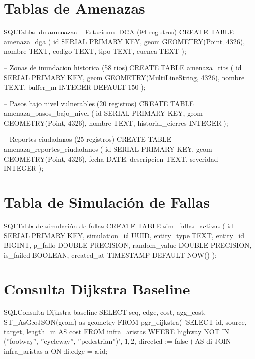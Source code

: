 \documentclass[conference]{IEEEtran}
\begin{document}
\section{Tablas de Amenazas}
\label{app:amenazas}

\begin{mycode}{SQL}{Tablas de amenazas}
-- Estaciones DGA (94 registros)
CREATE TABLE amenaza_dga (
    id SERIAL PRIMARY KEY,
    geom GEOMETRY(Point, 4326),
    nombre TEXT,
    codigo TEXT,
    tipo TEXT,
    cuenca TEXT
);

-- Zonas de inundacion historica (58 rios)
CREATE TABLE amenaza_rios (
    id SERIAL PRIMARY KEY,
    geom GEOMETRY(MultiLineString, 4326),
    nombre TEXT,
    buffer_m INTEGER DEFAULT 150
);

-- Pasos bajo nivel vulnerables (20 registros)
CREATE TABLE amenaza_pasos_bajo_nivel (
    id SERIAL PRIMARY KEY,
    geom GEOMETRY(Point, 4326),
    nombre TEXT,
    historial_cierres INTEGER
);

-- Reportes ciudadanos (25 registros)
CREATE TABLE amenaza_reportes_ciudadanos (
    id SERIAL PRIMARY KEY,
    geom GEOMETRY(Point, 4326),
    fecha DATE,
    descripcion TEXT,
    severidad INTEGER
);
\end{mycode}

\section{Tabla de Simulación de Fallas}
\label{app:simulacion}

\begin{mycode}{SQL}{Tabla de simulación de fallas}
CREATE TABLE sim_fallas_activas (
    id SERIAL PRIMARY KEY,
    simulation_id UUID,
    entity_type TEXT,
    entity_id BIGINT,
    p_fallo DOUBLE PRECISION,
    random_value DOUBLE PRECISION,
    is_failed BOOLEAN,
    created_at TIMESTAMP DEFAULT NOW()
);
\end{mycode}

\section{Consulta Dijkstra Baseline}
\label{app:dijkstra_baseline}

\begin{mycode}{SQL}{Consulta Dijkstra baseline}
SELECT seq, edge, cost, agg_cost,
       ST_AsGeoJSON(geom) as geometry
FROM pgr_dijkstra(
    'SELECT id, source, target,
            length_m AS cost
     FROM infra_aristas
     WHERE highway NOT IN (''footway'',
           ''cycleway'', ''pedestrian'')',
    $1, $2, directed := false
) AS di
JOIN infra_aristas a ON di.edge = a.id;
\end{mycode}
\end{document}
